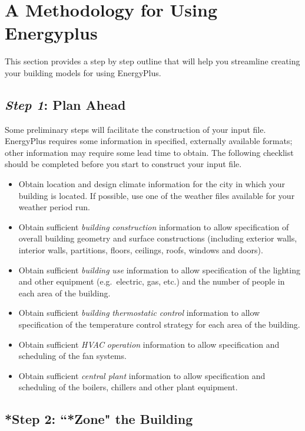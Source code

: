 \section{A Methodology for Using Energyplus}\label{a-methodology-for-using-energyplus}

This section provides a step by step outline that will help you streamline creating your building models for using EnergyPlus.

\subsection{\texorpdfstring{\emph{Step 1}: Plan Ahead}{Step 1: Plan Ahead}}\label{step-1-plan-ahead}

Some preliminary steps will facilitate the construction of your input file. EnergyPlus requires some information in specified, externally available formats; other information may require some lead time to obtain. The following checklist should be completed before you start to construct your input file.

\begin{itemize}
\item
  Obtain location and design climate information for the city in which your building is located. If possible, use one of the weather files available for your weather period run.
\item
  Obtain sufficient \emph{building} \emph{construction} information to allow specification of overall building geometry and surface constructions (including exterior walls, interior walls, partitions, floors, ceilings, roofs, windows and doors).
\item
  Obtain sufficient \emph{building} \emph{use} information to allow specification of the lighting and other equipment (e.g.~electric, gas, etc.) and the number of people in each area of the building.
\item
  Obtain sufficient \emph{building} \emph{thermostatic} \emph{control} information to allow specification of the temperature control strategy for each area of the building.
\item
  Obtain sufficient \emph{HVAC} \emph{operation} information to allow specification and scheduling of the fan systems.
\item
  Obtain sufficient \emph{central plant} information to allow specification and scheduling of the boilers, chillers and other plant equipment.
\end{itemize}

\subsection{*Step 2: ``*Zone" the Building}\label{step-2-zone-the-building}

